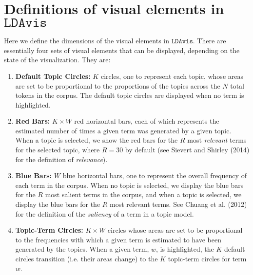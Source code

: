 \documentclass[12pt]{article}
\begin{document}

\section{Definitions of visual elements in $\texttt{LDAvis}$}
Here we define the dimensions of the visual elements in $\texttt{LDAvis}$. There are essentially four sets of visual elements that can be displayed, depending on the state of the visualization. They are:
\begin{enumerate}
\item \textbf{Default Topic Circles:} $K$ circles, one to represent each topic, whose areas are set to be proportional to the proportions of the topics across the $N$ total tokens in the corpus. The default topic circles are displayed when no term is highlighted.
\item \textbf{Red Bars:} $K \times W$ red horizontal bars, each of which represents the estimated number of times a given term was generated by a given topic. When a topic is selected, we show the red bars for the $R$ most \emph{relevant} terms for the selected topic, where $R = 30$ by default (see Sievert and Shirley (2014) for the definition of \emph{relevance}).
\item \textbf{Blue Bars:} $W$ blue horizontal bars, one to represent the overall frequency of each term in the corpus. When no topic is selected, we display the blue bars for the $R$ most salient terms in the corpus, and when a topic is selected, we display the blue bars for the $R$ most relevant terms. See Chuang et al. (2012) for the definition of the \emph{saliency} of a term in a topic model.
\item \textbf{Topic-Term Circles:} $K \times W$ circles whose areas are set to be proportional to the frequencies with which a given term is estimated to have been generated by the topics. When a given term, $w$, is highlighted, the $K$ default circles transition (i.e. their areas change) to the $K$ topic-term circles for term $w$.
\end{enumerate}
\end{document}
